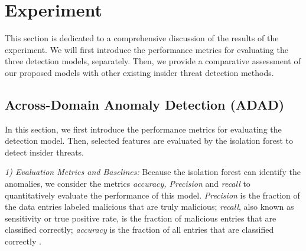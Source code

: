 \documentclass[conference]{IEEEtran}
\begin{document}
\section{Experiment}

This section is dedicated to a comprehensive discussion of the results of the experiment.
We will first introduce the performance metrics for evaluating the three detection models,  separately. Then, we provide a comparative assessment of our proposed models with other existing insider threat detection methods. 


\subsection{Across-Domain Anomaly Detection (ADAD)}\label{AA}
In this section, we first introduce the performance metrics for evaluating the detection model. 
Then, selected features are evaluated by the isolation forest to detect insider threats.


\emph{1) Evaluation Metrics and Baselines:}
Because the isolation forest can identify the anomalies, we consider the metrics \emph{accuracy, Precision} and \emph{recall} to quantitatively evaluate the performance of this model.  
\emph{Precision} is the
fraction of the data entries labeled malicious that are
truly malicious; \emph{recall}, also known as sensitivity or true
positive rate, is the fraction of malicious entries that are
classified correctly; \emph{accuracy} is the fraction of all entries
that are classified correctly \cite{b22}.

\end{document}
